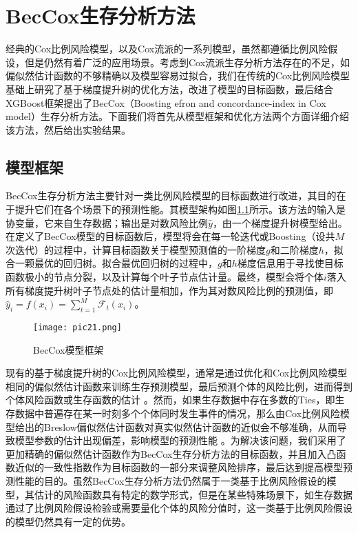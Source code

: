 \chapter{BecCox生存分析方法}

经典的Cox比例风险模型，以及Cox流派的一系列模型，虽然都遵循比例风险假设，但是仍然有着广泛的应用场景。考虑到Cox流派生存分析方法存在的不足，如偏似然估计函数的不够精确以及模型容易过拟合，我们在传统的Cox比例风险模型基础上研究了基于梯度提升树的优化方法，改进了模型的目标函数，最后结合XGBoost框架提出了BecCox（Boosting efron and concordance-index in Cox model）生存分析方法。下面我们将首先从模型框架和优化方法两个方面详细介绍该方法，然后给出实验结果。

\section{模型框架}

BecCox生存分析方法主要针对一类比例风险模型的目标函数进行改进，其目的在于提升它们在各个场景下的预测性能。其模型架构如图\ref{pic21}所示。该方法的输入是协变量，它来自生存数据；输出是对数风险比例$\hat{y}$，由一个梯度提升树模型给出。在定义了BecCox模型的目标函数后，模型将会在每一轮迭代或Boosting（设共$M$次迭代）的过程中，计算目标函数关于模型预测值的一阶梯度$g$和二阶梯度$h$，拟合一颗最优的回归树。拟合最优回归树的过程中，$g$和$h$梯度信息用于寻找使目标函数极小的节点分裂，以及计算每个叶子节点估计量。最终，模型会将个体$i$落入所有梯度提升树叶子节点处的估计量相加，作为其对数风险比例的预测值，即$\hat{y}_i = f(x_i) = \sum_{t=1}^{M} \mathcal{F}_t (x_i)$。

\begin{figure}[H]
\texttt{[image: pic21.png]}
\caption{BecCox模型框架}
\label{pic21}
\end{figure}

现有的基于梯度提升树的Cox比例风险模型，通常是通过优化和Cox比例风险模型相同的偏似然估计函数来训练生存预测模型，最后预测个体的风险比例，进而得到个体风险函数或生存函数的估计 。然而，如果生存数据中存在多数的Ties，即生存数据中普遍存在某一时刻多个个体同时发生事件的情况，那么由Cox比例风险模型给出的Breslow偏似然估计函数对真实似然估计函数的近似会不够准确，从而导致模型参数的估计出现偏差，影响模型的预测性能 。为解决该问题，我们采用了更加精确的偏似然估计函数作为BecCox生存分析方法的目标函数，并且加入凸函数近似的一致性指数作为目标函数的一部分来调整风险排序，最后达到提高模型预测性能的目的。虽然BecCox生存分析方法仍然属于一类基于比例风险假设的模型，其估计的风险函数具有特定的数学形式，但是在某些特殊场景下，如生存数据通过了比例风险假设检验或需要量化个体的风险分值时，这一类基于比例风险假设的模型仍然具有一定的优势。

